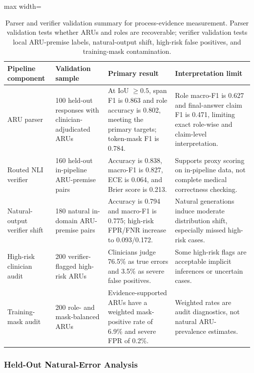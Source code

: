 \documentclass[a4paper,fleqn,doubleblind]{cas-sc}
\begin{document}
\begin{table}[!b]
    \centering
    \footnotesize
    \caption{Parser and verifier validation summary for process-evidence measurement. Parser validation tests whether ARUs and roles are recoverable; verifier validation tests local ARU-premise labels, natural-output shift, high-risk false positives, and training-mask contamination.}
    \label{tab:pipeline_validation_summary}
    \begin{adjustbox}{max width=\textwidth}
    \begin{tabular}{p{}p{}p{}p{}}
        \toprule
        \textbf{Pipeline component} & \textbf{Validation sample} & \textbf{Primary result} & \textbf{Interpretation limit} \\
        \midrule
        ARU parser & 100 held-out responses with clinician-adjudicated ARUs & At IoU $\geq 0.5$, span F1 is 0.863 and role accuracy is 0.802, meeting the primary targets; token-mask F1 is 0.784. & Role macro-F1 is 0.627 and final-answer claim F1 is 0.471, limiting exact role-wise and claim-level interpretation. \\
        Routed NLI verifier & 160 held-out in-pipeline ARU-premise pairs & Accuracy is 0.838, macro-F1 is 0.827, ECE is 0.064, and Brier score is 0.213. & Supports proxy scoring on in-pipeline data, not complete medical correctness checking. \\
        Natural-output verifier shift & 180 natural in-domain ARU-premise pairs & Accuracy is 0.794 and macro-F1 is 0.775; high-risk FPR/FNR increase to 0.093/0.172. & Natural generations induce moderate distribution shift, especially missed high-risk cases. \\
        High-risk clinician audit & 200 verifier-flagged high-risk ARUs & Clinicians judge 76.5\% as true errors and 3.5\% as severe false positives. & Some high-risk flags are acceptable implicit inferences or uncertain cases. \\
        Training-mask audit & 200 role- and mask-balanced ARUs & Evidence-supported ARUs have a weighted mask-positive rate of 6.9\% and severe FPR of 0.2\%. & Weighted rates are audit diagnostics, not natural ARU-prevalence estimates. \\
        \bottomrule
    \end{tabular}
    \end{adjustbox}
\end{table}

\subsubsection{Held-Out Natural-Error Analysis}
\label{subsec:heldout_natural_error_analysis}
\end{document}
